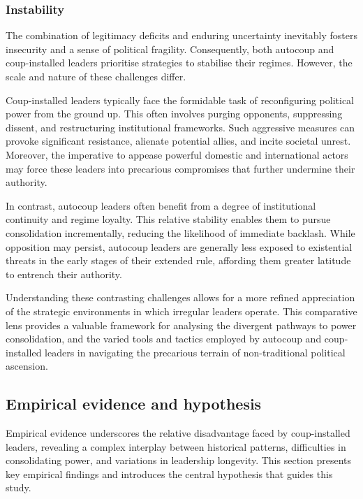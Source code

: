 \documentclass[
  12pt,
]{report}
\begin{document}
\subsubsection*{Instability}\label{instability}

The combination of legitimacy deficits and enduring uncertainty
inevitably fosters insecurity and a sense of political fragility.
Consequently, both autocoup and coup-installed leaders prioritise
strategies to stabilise their regimes. However, the scale and nature of
these challenges differ.

Coup-installed leaders typically face the formidable task of
reconfiguring political power from the ground up. This often involves
purging opponents, suppressing dissent, and restructuring institutional
frameworks. Such aggressive measures can provoke significant resistance,
alienate potential allies, and incite societal unrest. Moreover, the
imperative to appease powerful domestic and international actors may
force these leaders into precarious compromises that further undermine
their authority.

In contrast, autocoup leaders often benefit from a degree of
institutional continuity and regime loyalty. This relative stability
enables them to pursue consolidation incrementally, reducing the
likelihood of immediate backlash. While opposition may persist, autocoup
leaders are generally less exposed to existential threats in the early
stages of their extended rule, affording them greater latitude to
entrench their authority.

Understanding these contrasting challenges allows for a more refined
appreciation of the strategic environments in which irregular leaders
operate. This comparative lens provides a valuable framework for
analysing the divergent pathways to power consolidation, and the varied
tools and tactics employed by autocoup and coup-installed leaders in
navigating the precarious terrain of non-traditional political
ascension.

\subsection{Empirical evidence and
hypothesis}\label{empirical-evidence-and-hypothesis}

Empirical evidence underscores the relative disadvantage faced by
coup-installed leaders, revealing a complex interplay between historical
patterns, difficulties in consolidating power, and variations in
leadership longevity. This section presents key empirical findings and
introduces the central hypothesis that guides this study.
\end{document}
